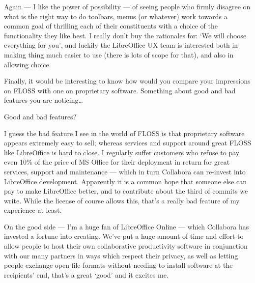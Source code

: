 \documentclass[10pt, a5paper]{article}
\begin{document}
\begin{Parallel}[p]{}{}
{\a Again — I like the power of possibility — of seeing people who firmly disagree on what is the right way to do toolbars, menus (or whatever) work towards a common goal of thrilling each of their constituents with a choice of the functionality they like best. I really don't buy the rationales for: ‘We will choose everything for you’, and luckily the LibreOffice UX team is interested both in making thing much easier to use (there is lots of scope for that), and also in allowing choice.

\newpage
\q Finally, it would be interesting to know how would you compare your impressions on FLOSS with one on proprietary software. Something about good and bad features you are noticing…

\a Good and bad features?

I guess the bad feature I see in the world of FLOSS is that proprietary software appears extremely easy to sell; whereas services and support around great FLOSS like LibreOffice is hard to close. I regularly suffer customers who refuse to pay even 10\% of the price of MS Office for their deployment in return for great services, support and maintenance — which in turn Collabora can re-invest into LibreOffice development. Apparently it is a common hope that someone else can pay to make LibreOffice better, and to contribute about the third of commits we write. While the license of course allows this, that's a really bad feature of my experience at least.

On the good side — I'm a huge fan of LibreOffice Online — which Collabora has invested a fortune into creating. We've put a huge amount of time and effort to allow people to host their own collaborative productivity software in conjunction with our many partners in ways which respect their privacy, as well as letting people exchange open file formats without needing to install software at the recipients' end, that's a great ‘good’ and it excites me.

\vfill
     }
\end{Parallel}
\end{document}
